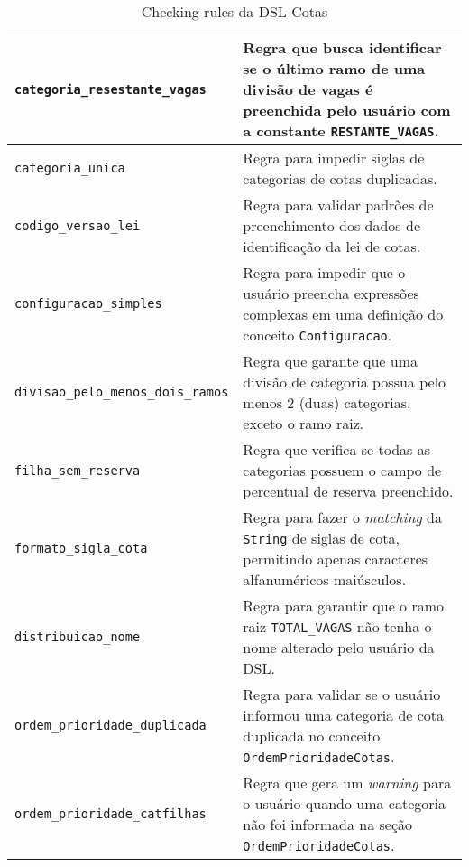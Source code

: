 \begin{table}[ht]
\caption{Checking rules da DSL Cotas}
\label{tblcheckingrules}
\centering

\begin{tabular}{|p{6cm}|p{8cm}|}
\hline
\texttt{categoria\_resestante\_vagas} & Regra que busca identificar se o último ramo de uma divisão de vagas é preenchida pelo usuário com a constante \texttt{RESTANTE\_VAGAS}.                                                                                      \\ \hline
\texttt{categoria\_unica} & Regra para impedir siglas de categorias de cotas duplicadas.                         \\ \hline
\texttt{codigo\_versao\_lei}          & Regra para validar padrões de preenchimento dos dados de identificação da lei de cotas.                                       \\ \hline
\texttt{configuracao\_simples}          & Regra para impedir que o usuário preencha expressões complexas em uma definição do conceito \texttt{Configuracao}.
                        \\ \hline
\texttt{divisao\_pelo\_menos\_dois\_ramos}          & Regra que garante que uma divisão de categoria possua pelo menos 2 (duas) categorias, exceto o ramo raiz.
                        \\ \hline
\texttt{filha\_sem\_reserva}          & Regra que verifica se todas as categorias possuem o campo de percentual de reserva preenchido.

\\ \hline
               
\texttt{formato\_sigla\_cota}          & Regra para fazer o \textit{matching} da \texttt{String} de siglas de cota, permitindo apenas caracteres alfanuméricos maiúsculos.
\\ \hline

\texttt{distribuicao\_nome}          & Regra para garantir que o ramo raiz \texttt{TOTAL\_VAGAS} não tenha o nome alterado pelo usuário da DSL.
\\ \hline

\texttt{ordem\_prioridade\_duplicada}          & Regra para validar se o usuário informou uma categoria de cota duplicada no conceito \texttt{OrdemPrioridadeCotas}.
\\ \hline

\texttt{ordem\_prioridade\_catfilhas}          & Regra que gera um \textit{warning} para o usuário quando uma categoria não foi informada na seção \texttt{OrdemPrioridadeCotas}.
\\ \hline


\end{tabular}
\end{table}
